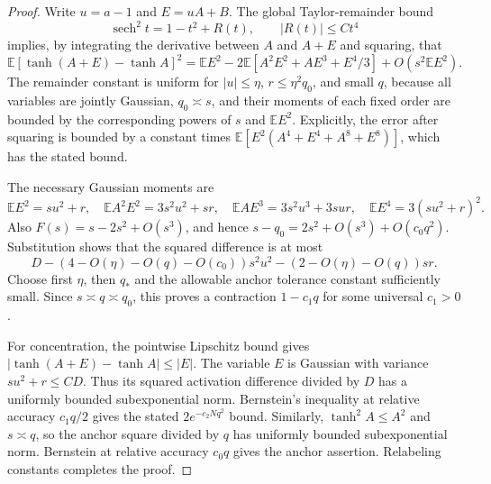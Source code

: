 \begin{proof}
Write $u=a-1$ and $E=uA+B$. The global Taylor-remainder bound
\[
 \operatorname{sech}^2 t=1-t^2+R(t),\qquad |R(t)|\le C t^4
\]
implies, by integrating the derivative between $A$ and $A+E$ and
squaring, that
\[
 \mathbb E[\tanh(A+E)-\tanh A]^2
 =\mathbb E E^2-2\mathbb E[A^2E^2+AE^3+E^4/3]
                 +O(s^2\mathbb E E^2).
\]
The remainder constant is uniform for $|u|\le\eta$,
$r\le\eta^2q_0$, and small $q$, because all variables are jointly
Gaussian, $q_0\asymp s$, and their moments of each fixed order are
bounded by the corresponding powers of $s$ and $\mathbb E E^2$.
Explicitly, the error after squaring is bounded by a constant times
$\mathbb E[E^2(A^4+E^4+A^8+E^8)]$, which has the stated bound.

The necessary Gaussian moments are
\[
 \mathbb E E^2=su^2+r,\quad
 \mathbb E A^2E^2=3s^2u^2+sr,\quad
 \mathbb E AE^3=3s^2u^3+3sur,\quad
 \mathbb E E^4=3(su^2+r)^2.
\]
Also $F(s)=s-2s^2+O(s^3)$, and hence
$s-q_0=2s^2+O(s^3)+O(c_0q^2)$.
Substitution shows that the squared difference is at most
\[
 D-(4-O(\eta)-O(q)-O(c_0))s^2u^2
       -(2-O(\eta)-O(q))sr.
\]
Choose first $\eta$, then $q_*$ and the allowable anchor tolerance
constant sufficiently small. Since $s\asymp q\asymp q_0$, this
proves a contraction $1-c_1q$ for some universal $c_1>0$.

For concentration, the pointwise Lipschitz bound gives
$|\tanh(A+E)-\tanh A|\le|E|$. The variable $E$ is Gaussian
with variance $su^2+r\le CD$. Thus its squared activation difference
divided by $D$ has a uniformly bounded subexponential norm.
Bernstein's inequality at relative accuracy $c_1q/2$ gives the stated
$2e^{-c_2Nq^2}$ bound. Similarly, $\tanh^2 A\le A^2$ and
$s\asymp q$, so the anchor square divided by $q$ has uniformly
bounded subexponential norm. Bernstein at relative accuracy $c_0q$
gives the anchor assertion. Relabeling constants completes the proof.
\end{proof}


